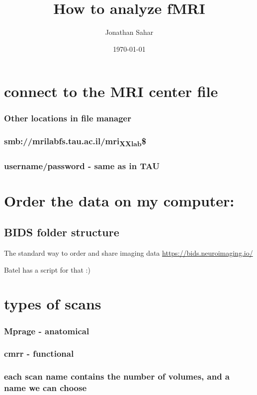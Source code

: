 \documentclass[11pt]{article}
\author{Jonathan Sahar}
\date{\today}
\title{How to analyze fMRI}
\begin{document}
\maketitle


\section{connect to the MRI center file}
\label{sec:org5b743e0}
\subsubsection{Other locations in file manager}
\label{sec:org123b17a}
\subsubsection{smb://mrilabfs.tau.ac.il/mri\textsubscript{XX}\textsubscript{lab}\$}
\label{sec:orge88f15b}
\subsubsection{username/password - same as in TAU}
\label{sec:org10ac99a}


\section{Order the data on my computer:}
\label{sec:org6e781f0}
\subsection{BIDS  folder structure}
\label{sec:orga595d4e}
The standard way to order and share imaging data
\url{https://bids.neuroimaging.io/}

Batel has a script for that :)

\section{types of scans}
\label{sec:org5ceac9a}
\subsubsection{Mprage - anatomical}
\label{sec:org633bc34}
\subsubsection{cmrr - functional}
\label{sec:org18adb09}
\subsubsection{each scan name contains the number of volumes, and a name we can choose}
\label{sec:org634b438}
\end{document}
